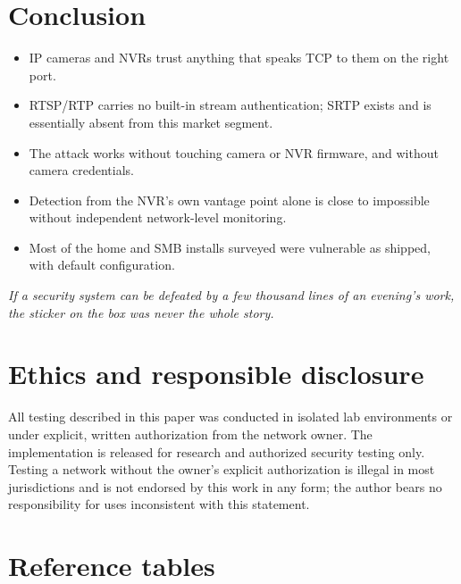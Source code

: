 \documentclass[11pt,a4paper]{article}
\begin{document}
\section{Conclusion}
\begin{itemize}[leftmargin=1.3em, itemsep=3pt]
\item IP cameras and NVRs trust anything that speaks TCP to them on the right port.
\item RTSP/RTP carries no built-in stream authentication; SRTP exists and is essentially absent from this market segment.
\item The attack works without touching camera or NVR firmware, and without camera credentials.
\item Detection from the NVR's own vantage point alone is close to impossible without independent network-level monitoring.
\item Most of the home and SMB installs surveyed were vulnerable as shipped, with default configuration.
\end{itemize}
\emph{\color{inksoft}If a security system can be defeated by a few thousand lines of an evening's work, the sticker on the box was never the whole story.}

\section{Ethics and responsible disclosure}
All testing described in this paper was conducted in isolated lab environments or under explicit, written authorization from the network owner. The implementation is released for research and authorized security testing only. Testing a network without the owner's explicit authorization is illegal in most jurisdictions and is not endorsed by this work in any form; the author bears no responsibility for uses inconsistent with this statement.

\appendix
\section{Reference tables}
\end{document}
